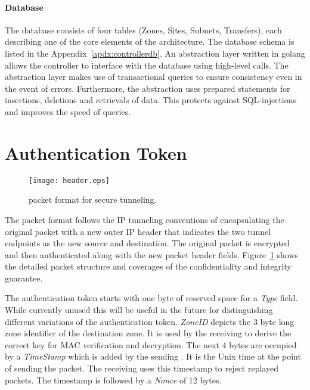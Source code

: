 \paragraph{Database}
The database consists of four tables (Zones, Sites, Subnets, Transfers), each describing one of
the core elements of the architecture.
The database schema is listed in the Appendix~\ref{apdx:controllerdb}. An abstraction layer
written in golang allows the controller to interface with the database using high-level calls.
The abstraction layer makes use of transactional queries to ensure consistency even in the event
of errors. Furthermore, the abstraction uses prepared statements for insertions, deletions and
retrievals of data. This protects against SQL-injections and improves the speed of queries.


\section{Authentication Token}
\label{sec:token}

\begin{figure}[htb]
	\begin{center}
		\texttt{[image: header.eps]}
	\end{center}
	\caption{\name packet format for secure tunneling.}
	\label{fig:header}
\end{figure}

The \name packet format follows the IP tunneling conventions of encapsulating the original
packet with a new outer IP header that indicates the two tunnel endpoints as the new source
and destination. The original packet is encrypted and then authenticated along with the new
packet header fields. Figure~\ref{fig:header} shows the detailed packet structure and coverages
of the confidentiality and integrity guarantee.

The authentication token starts with one byte of reserved space for a \textit{Type} field. While
currently unused this will be useful in the future for distinguishing different variations of
the authentication token. \textit{ZoneID} depicts the 3 byte long zone identifier of the
destination zone. It is used by the receiving \tp to derive the correct key for MAC verification
and decryption. The next 4 bytes are occupied by a \textit{TimeStamp} which is added by the
sending \tp. It is the Unix time at the point of sending the packet. The receiving \tp uses this
timestamp to reject replayed packets. The timestamp is followed by a \textit{Nonce} of 12 bytes.

